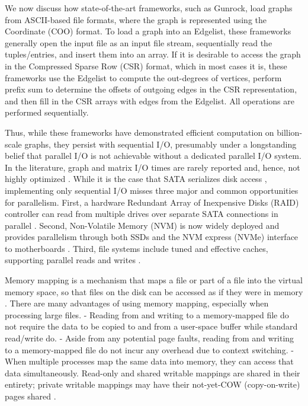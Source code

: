 We now discuss how state-of-the-art frameworks, such as Gunrock, load graphs from ASCII-based file formats, where the graph is represented using the Coordinate (COO) format. To load a graph into an Edgelist, these frameworks generally open the input file as an input file stream, sequentially read the tuples/entries, and insert them into an array. If it is desirable to access the graph in the Compressed Sparse Row (CSR) format, which in most cases it is, these frameworks use the Edgelist to compute the out-degrees of vertices, perform prefix sum to determine the offsets of outgoing edges in the CSR representation, and then fill in the CSR arrays with edges from the Edgelist. All operations are performed sequentially.

Thus, while these frameworks have demonstrated efficient computation on billion-scale graphs, they persist with sequential I/O, presumably under a longstanding belief that parallel I/O is not achievable without a dedicated parallel I/O system. In the literature, graph and matrix I/O times are rarely reported and, hence, not highly optimized \cite{gabert2021pigo}. While it is the case that SATA serializes disk access \cite{tavakkol2018mqsim}, implementing only sequential I/O misses three major and common opportunities for parallelism. First, a hardware Redundant Array of Inexpensive Disks (RAID) controller can read from multiple drives over separate SATA connections in parallel \cite{patterson1988case}. Second, Non-Volatile Memory (NVM) is now widely deployed \cite{jung2020openexpress} and provides parallelism through both SSDs and the NVM express (NVMe) interface to motherboards \cite{tavakkol2018mqsim}. Third, file systems include tuned and effective caches, supporting parallel reads and writes \cite{mathur2007new}.

Memory mapping is a mechanism that maps a file or part of a file into the virtual memory space, so that files on the disk can be accessed as if they were in memory \cite{lin2014mmap}. There are many advantages of using memory mapping, especially when processing large files. - Reading from and writing to a memory-mapped file do not require the data to be copied to and from a user-space buffer while standard read/write do. - Aside from any potential page faults, reading from and writing to a memory-mapped file do not incur any overhead due to context switching. - When multiple processes map the same data into memory, they can access that data simultaneously. Read-only and shared writable mappings are shared in their entirety; private writable mappings may have their not-yet-COW (copy-on-write) pages shared \cite{lin2014mmap}.

